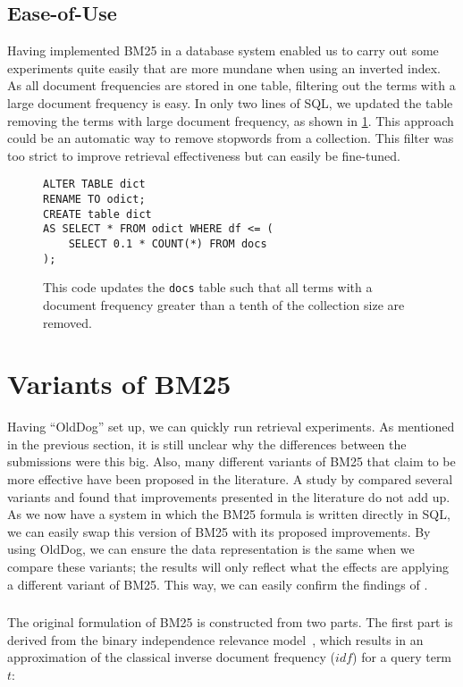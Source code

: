 \subsection{Ease-of-Use}
Having implemented BM25 in a database system enabled us to carry out some experiments quite easily that are more mundane when using an inverted index. As all document frequencies are stored in one table, filtering out the terms with a large document frequency is easy. In only two lines of SQL, we updated the table removing the terms with large document frequency, as shown in \cref{fig:remove-high-df}. This approach could be an automatic way to remove stopwords from a collection. This filter was too strict to improve retrieval effectiveness but can easily be fine-tuned.

\begin{figure}
	\begin{verbatim}
ALTER TABLE dict 
RENAME TO odict;
CREATE table dict 
AS SELECT * FROM odict WHERE df <= (
	SELECT 0.1 * COUNT(*) FROM docs
);		
	\end{verbatim}
	\caption{This code updates the \texttt{docs} table such that all terms with a document frequency greater than a tenth of the collection size are removed.}
	\label{fig:remove-high-df}
\end{figure}

\section{Variants of BM25}
Having ``OldDog'' set up, we can quickly run retrieval experiments. As mentioned in the previous section, it is still unclear why the differences between the submissions were this big. Also, many different variants of BM25 that claim to be more effective have been proposed in the literature. A study by \citet{trotman-bm25} compared several variants and found that improvements presented in the literature do not add up. 
As we now have a system in which the BM25 formula is written directly in SQL, we can easily swap this version of BM25 with its proposed improvements. By using OldDog, we can ensure the data representation is the same when we compare these variants; the results will only reflect what the effects are applying a different variant of BM25. This way, we can easily confirm the findings of \citeauthor{trotman-bm25}.

\subsubsection{} 
The original formulation of BM25 is constructed from two parts. The first part is derived from the binary independence relevance model~\citep{bm25-beyond}, which results in an approximation of the classical inverse document frequency ($\mathit{idf}$) for a query term $t$:

